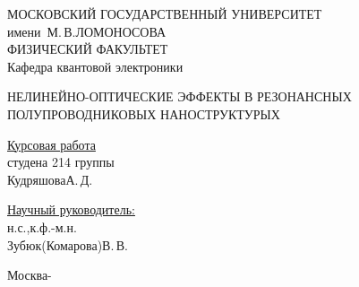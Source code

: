 \begin{titlepage}

\begin{center}
\large
МОСКОВСКИЙ ГОСУДАРСТВЕННЫЙ УНИВЕРСИТЕТ\\
имени~М.\,В.\;ЛОМОНОСОВА\\
ФИЗИЧЕСКИЙ ФАКУЛЬТЕТ\\
Кафедра квантовой электроники
\end{center}

\vfill

\begin{center}
\large
НЕЛИНЕЙНО-ОПТИЧЕСКИЕ ЭФФЕКТЫ В РЕЗОНАНСНЫХ ПОЛУПРОВОДНИКОВЫХ НАНОСТРУКТУРЫХ
\end{center}

\vfill

\begin{flushright}
\begin{minipage}{0.35\textwidth}
\underline{Курсовая работа}\\
студена 214 группы\\
Кудряшова\;А.\,Д.
\end{minipage}
\end{flushright}
\vspace*{6mm}
\begin{flushright}
\begin{minipage}{0.35\textwidth}
\underline{Научный руководитель:}\\
н.с.,\;к.ф.-м.н.\\
Зубюк(Комарова)\;В.\,В.\\
\end{minipage}
\end{flushright}

\vfill

\centerline{Москва\;-}

\end{titlepage}